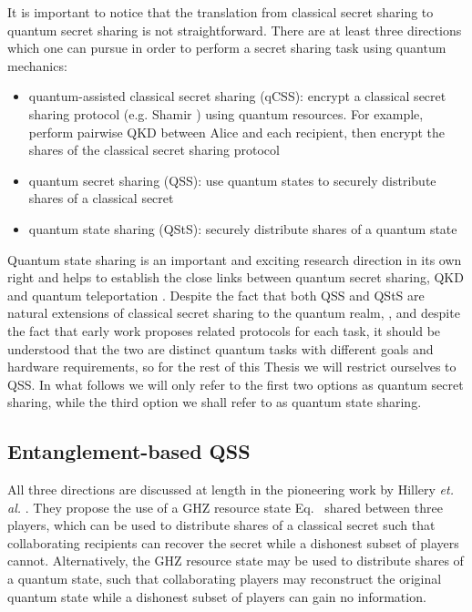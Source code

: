 It is important to notice that the translation from classical secret sharing to quantum secret sharing is not straightforward. There are at least three directions which one can pursue in order to perform a secret sharing task using quantum mechanics:

\begin{itemize}
\item quantum-assisted classical secret sharing (qCSS): encrypt a classical secret sharing protocol (e.g. Shamir ) using quantum resources. For example, perform pairwise QKD between Alice and each recipient, then encrypt the shares of the classical secret sharing protocol
\item quantum secret sharing (QSS): use quantum states to securely distribute shares of a classical secret
\item quantum state sharing (QStS): securely distribute shares of a quantum state
\end{itemize}

Quantum state sharing is an important and exciting research direction in its own right and helps to establish the close links between quantum secret sharing, QKD and quantum teleportation . Despite the fact that both QSS and QStS are natural extensions of classical secret sharing to the quantum realm, , and despite the fact that early work  proposes related protocols for each task, it should be understood that the two are distinct quantum tasks with different goals and hardware requirements, so for the rest of this Thesis we will restrict ourselves to QSS. In what follows we will only refer to the first two options as quantum secret sharing, while the third option we shall refer to as quantum state sharing.

\subsection{Entanglement-based QSS}

All three directions are discussed at length in the pioneering work by Hillery \emph{et. al.} \cite{Hillery1999}. They propose the use of a GHZ resource state Eq.~ shared between three players, which can be used to distribute shares of a classical secret such that collaborating recipients can recover the secret while a dishonest subset of players cannot. Alternatively, the GHZ resource state may be used to distribute shares of a quantum state, such that collaborating players may reconstruct the original quantum state while a dishonest subset of players can gain no information.

